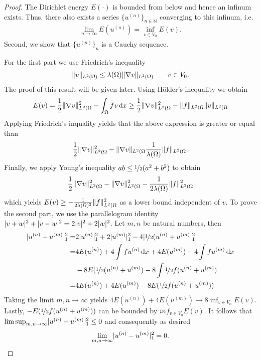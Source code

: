 \begin{proof}
  The Dirichlet energy $E(\cdot)$ is bounded from
  below and hence an infinum exists. Thus, there also exists a series
  $\{u^{(n)}\}_{n \in \mathbb{N}}$ converging to this infinum, i.e.
  \begin{gather*}
    \lim_{n \to \infty} E(u^{(n)}) = \inf_{v \in V_0} E(v).
  \end{gather*}
  Second, we show that $\{u^{(n)}\}_n$ is a Cauchy sequence.
  
  For the first part we use Friedrich's inequality
  \begin{gather*}
    \lVert v\rVert_{L^2(\Omega)} \le \lambda(\Omega)
    \lVert\nabla v\rVert_{L^2(\Omega)} \qquad v \in V_0.
  \end{gather*}
  The proof of this result will be given later. Using Hölder's inequality
  we obtain
  \begin{gather*}
    E(v) = \frac 12 \lVert\nabla v\rVert^2 _{L^2(\Omega} - \int_\Omega fv \,\mathrm{d} x
    \ge \frac 12 \lVert\nabla v\rVert^2 _{L^2(\Omega}
    - \lVert f\rVert_{L^2(\Omega} \lVert v\rVert_{L^2(\Omega}
  \end{gather*}
  Applying Friedrich's inquality yields that the above expression is
  greater or equal than
  \begin{gather*}
    \frac 12 \lVert\nabla v\rVert^2 _{L^2(\Omega}
    - \lVert\nabla v\rVert_{L^2(\Omega} \frac 1{\lambda (\Omega)}
    \lVert f\rVert_{L^2(\Omega}.
  \end{gather*}
  Finally, we apply Young's inequality $ab \le \nicefrac 12 (a^2 + b^2)$ to obtain
  \begin{gather*}
    \frac 12 \lVert\nabla v\rVert^2 _{L^2(\Omega}
    - \lVert\nabla v\rVert_{L^2(\Omega}^2 - \frac 1{2\lambda (\Omega)} \lVert f\rVert_{L^2(\Omega}^2
  \end{gather*}
  which yields $E(v) \ge - \frac 1{2\lambda (\Omega)^2} \lVert f\rVert_{L^2(\Omega}^2$
  as a lower bound independent of $v$. To prove the second part,
  we use the parallelogram identity $\lvert v+w\rvert^2 + \lvert v-w\rvert^2 = 2\lvert v\rvert^2 + 2 \lvert w\rvert^2$.
  Let $m, n$ be natural numbers, then
  \begin{align*}
    \lvert u^{(n)} - u^{(m)}\rvert^2 _1 =& 2 \lvert u^{(n)}\rvert^2 _1
                                      + 2 \lvert u^{(m)}\rvert^2_1- 4 \lvert\nicefrac 12 (u^{(n)} + u^{(m)}\rvert^2_1 \\
    =& 4 E(u^{(n)}) + 4\int f u^{(n)} \,\mathrm{d} x + 4 E(u^{(m)}) + 4\int f u^{(m)} \,\mathrm{d} x \\
                                    &- 8 E(\nicefrac 12 (u^{(n)} + u^{(m)}) - 8 \int \nicefrac 12 f(u^{(n)} + u^{(m)}) \\
    =& 4 E(u^{(n)}) + 4 E(u^{(m)}) - 8 E(\nicefrac 12 f(u^{(n)} + u^{(m)}))
  \end{align*}
  Taking the limit $m,n\to \infty$ yields $4 E(u^{(n)}) + 4 E(u^{(m)})
  \to 8 \inf_{v \in V_0} E(v)$. Lastly, $-E(\nicefrac 12 f(u^{(n)} + u^{(m)}))$ can
  be bounded by $inf_{v \in V_0} E(v)$. It follows that $\limsup_{m,n\to\infty}
  \lvert u^{(n)}-u^{(m)}\rvert^2_1 \le 0$ and consequently as desired
  \begin{gather*}
    \lim_{m,n\to\infty} \lvert u^{(n)}-u^{(m)}\rvert^2_1 = 0.
  \end{gather*}    
\end{proof}

